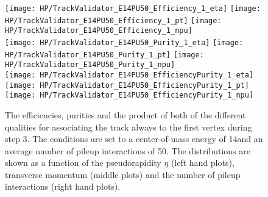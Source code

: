 \begin{figure}[!h]
  \centering
  \texttt{[image: HP/TrackValidator\_E14PU50\_Efficiency\_1\_eta]}
  \texttt{[image: HP/TrackValidator\_E14PU50\_Efficiency\_1\_pt]}
  \texttt{[image: HP/TrackValidator\_E14PU50\_Efficiency\_1\_npu]}
   \\
  \texttt{[image: HP/TrackValidator\_E14PU50\_Purity\_1\_eta]}
  \texttt{[image: HP/TrackValidator\_E14PU50\_Purity\_1\_pt]}
  \texttt{[image: HP/TrackValidator\_E14PU50\_Purity\_1\_npu]}
   \\
  \texttt{[image: HP/TrackValidator\_E14PU50\_EfficiencyPurity\_1\_eta]}
  \texttt{[image: HP/TrackValidator\_E14PU50\_EfficiencyPurity\_1\_pt]}
  \texttt{[image: HP/TrackValidator\_E14PU50\_EfficiencyPurity\_1\_npu]}
  \caption[Efficiencies, purities and their product of the different qualities of the association map with associating the track always to the first vertex during step 3 with 14\TeV and $\left<PU\right>=50$]{The efficiencies, purities and the product of both of the different qualities for associating the track always to the first vertex during step 3. The conditions are set to a center-of-mass energy of 14\TeV and an average number of pileup interactions of 50. The distributions are shown as a function of the pseudorapidity $\eta$ (left hand plots), transverse momentum (middle plots) and the number of pileup interactions (right hand plots).}
\end{figure}
\clearpage

